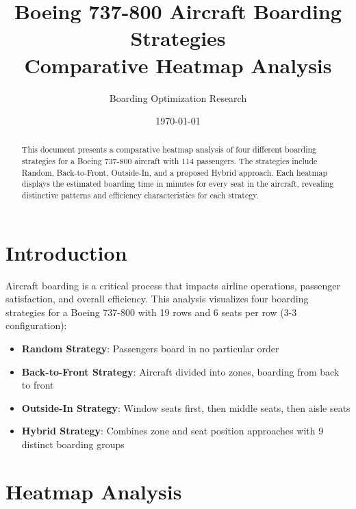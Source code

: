 \documentclass{article}
\begin{document}
\title{Boeing 737-800 Aircraft Boarding Strategies\\Comparative Heatmap Analysis}
\author{Boarding Optimization Research}
\date{\today}

\maketitle

\begin{abstract}
This document presents a comparative heatmap analysis of four different boarding strategies for a Boeing 737-800 aircraft with 114 passengers. The strategies include Random, Back-to-Front, Outside-In, and a proposed Hybrid approach. Each heatmap displays the estimated boarding time in minutes for every seat in the aircraft, revealing distinctive patterns and efficiency characteristics for each strategy.
\end{abstract}

\section{Introduction}

Aircraft boarding is a critical process that impacts airline operations, passenger satisfaction, and overall efficiency. This analysis visualizes four boarding strategies for a Boeing 737-800 with 19 rows and 6 seats per row (3-3 configuration):

\begin{itemize}
    \item \textbf{Random Strategy}: Passengers board in no particular order
    \item \textbf{Back-to-Front Strategy}: Aircraft divided into zones, boarding from back to front
    \item \textbf{Outside-In Strategy}: Window seats first, then middle seats, then aisle seats
    \item \textbf{Hybrid Strategy}: Combines zone and seat position approaches with 9 distinct boarding groups
\end{itemize}

\section{Heatmap Analysis}
\end{document}

